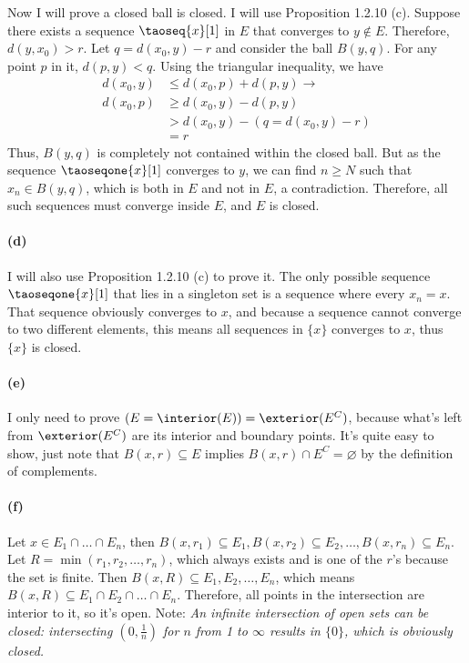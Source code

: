Now I will prove a closed ball is closed. I will use Proposition 1.2.10 (c). Suppose there exists a sequence $\taoseq{x}[1]$ in $E$ that converges to $y \notin E$. Therefore, $d(y,x_0) > r$. Let $q = d(x_0, y) - r$ and consider the ball $B(y, q)$. For any point $p$ in it, $d(p,y) < q$. Using the triangular inequality, we have
\begin{align*}
d(x_0, y)	&\le d(x_0, p) + d(p, y) \to \\
d(x_0, p)	&\ge d(x_0, y) - d(p, y) \\
			&>   d(x_0, y) - (q = d(x_0, y) - r) \\
			&=   r
\end{align*}
Thus, $B(y, q)$ is completely not contained within the closed ball. But as the sequence $\taoseqone{x}[1]$ converges to $y$, we can find $n \ge N$ such that $x_n \in B(y, q)$, which is both in $E$ and not in $E$, a contradiction. Therefore, all such sequences must converge inside $E$, and $E$ is closed.

\paragraph{(d)}
I will also use Proposition 1.2.10 (c) to prove it. The only possible sequence $\taoseqone{x}[1]$ that lies in a singleton set is a sequence where every $x_n = x$. That sequence obviously converges to $x$, and because a sequence cannot converge to two different elements, this means all sequences in $\{x\}$ converges to $x$, thus $\{x\}$ is closed.

\paragraph{(e)} I only need to prove $(E = \interior(E)) = \exterior(E^C)$, because what's left from $\exterior(E^C)$ are its interior and boundary points. It's quite easy to show, just note that $B(x, r) \subseteq E$ implies $B(x, r) \cap E^C = \varnothing$ by the definition of complements.

\paragraph{(f)} 
Let $x \in E_1 \cap \dots \cap E_n$, then $B(x, r_1) \subseteq E_1, B(x, r_2) \subseteq E_2, \dots, B(x, r_n) \subseteq E_n$. Let $R = \min(r_1, r_2, \dots, r_n)$, which always exists and is one of the $r$'s because the set is finite. Then $B(x, R) \subseteq E_1, E_2, \dots, E_n$, which means $B(x, R) \subseteq E_1 \cap E_2 \cap \dots \cap E_n$. Therefore, all points in the intersection are interior to it, so it's open. Note: \emph{An infinite intersection of open sets can be closed: intersecting $(0, \frac{1}{n})$ for $n$ from 1 to $\infty$ results in $\{0\}$, which is obviously closed.}

